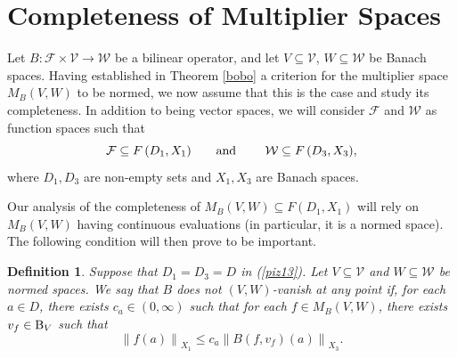 \documentclass[14pt, a4paper]{article}  %
\providecommand{\pare}[1]{\left( #1\right) }
\providecommand{\norm}[1]{\left\lVert#1\right\rVert}
\newcommand{\B}{\textup{B}}
\newcommand{\F}{\mathcal{F}}
\newcommand{\V}{\mathcal{V}}
\newcommand{\W}{\mathcal{W}}
\newtheorem{definition}{Definition}[section]
\begin{document}
 

\section[Completion of multiplier spaces]{Completeness of Multiplier Spaces}\label{q21}\label{pop3}

Let $B: \F \times \V \to \W$ be a bilinear operator, and let $V \subseteq \V$, $W \subseteq \W$ be Banach spaces. Having established in Theorem \ref{bobo} a criterion for the multiplier space $M_{B}\pare{V,W}$ to be normed, we now assume that this is the case and study its completeness. In addition to being vector spaces, we will consider $\F$ and $\W$ as function spaces such that
\begin{equation}\label{piz13} 
\text{$\F\subseteq F\pare{D_{1}, X_{1}}$\qquad \text{and} \qquad  $\W\subseteq F\pare{D_{3},X_{3}}$},
\end{equation} where $D_{1},D_{3}$ are non-empty sets and $X_{1},X_{3}$ are Banach spaces. 

Our analysis of the completeness of $M_{B}\pare{V,W} \subseteq F\pare{D_{1},X_{1}}$ will rely on $M_B(V,W)$ having continuous evaluations  (in particular, it is a normed space). The following condition will then prove to be important.


 
\begin{definition}\label{d1} Suppose that $D_{1} = D_{3} = D$ in (\ref{piz13}). Let $V \subseteq \V$ and $W \subseteq \W$ be normed spaces. We say that $B$ \emph{does not  $\pare{V,W}$-vanish at any point}  if, for each $a\in D$, there exists $c_{a}\in (0,\infty)$ such that for each $f\in M_{B}\pare{V,W}$, there exists $v_{f}\in \B_{V}$  such that
	\begin{equation}\label{piz17} 
		\norm{f\pare{a}}_{X_{1}}\leq c_{a} \norm{B\pare{f,v_{f}}\pare{a}}_{X_{3}}.
	\end{equation}
\end{definition}
\end{document}
